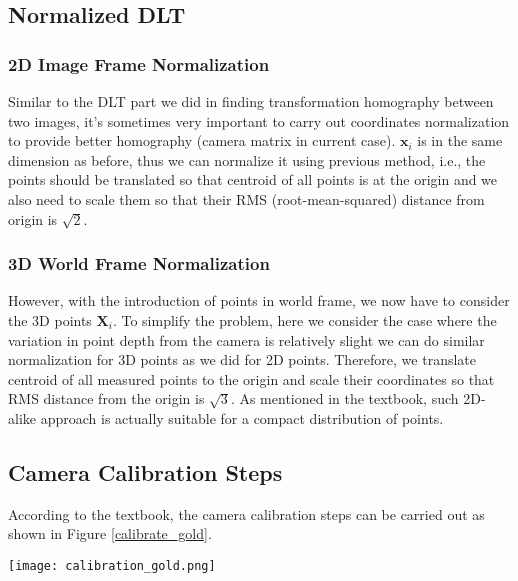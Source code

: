\documentclass[conference]{IEEEtran}
\newcommand{\mat}[1]{\mathbf{#1}} %
\begin{document}
\subsection{Normalized DLT}
\subsubsection{2D Image Frame Normalization}
Similar to the DLT part we did in finding transformation homography between two images, it's sometimes very important to carry out coordinates normalization to provide better homography (camera matrix in current case). $\mat{x}_i$ is in the same dimension as before, thus we can normalize it using previous method, i.e., the points should be translated so that centroid of all points is at the origin and we also need to scale them so that their RMS (root-mean-squared) distance from origin is $\sqrt{2}$. 
\subsubsection{3D World Frame Normalization}
However, with the introduction of points in world frame, we now have to consider the 3D points $\mat{X}_i$. To simplify the problem, here we consider the case where the variation in point depth from the camera is relatively slight we can do similar normalization for 3D points as we did for 2D points. Therefore, we translate centroid of all measured points to the origin and scale their coordinates so that RMS distance from the origin is $\sqrt{3}$. As mentioned in the textbook, such 2D-alike approach is actually suitable for a compact distribution of points.

\subsection{Camera Calibration Steps}
According to the textbook, the camera calibration steps can be carried out as shown in Figure \ref{calibrate_gold}.
\begin{figure*}
  \label{calibrate_gold}
  \centering \texttt{[image: calibration\_gold.png]}
  \caption{Algorithm of Camera Calibration using Gold Standard}
\end{figure*}

%
\end{document}
